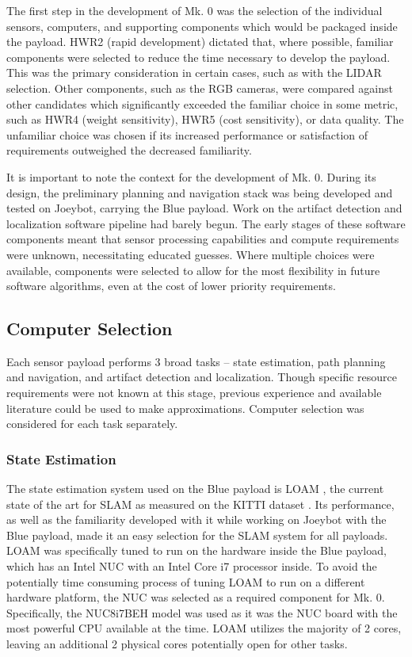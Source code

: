 The first step in the development of Mk. 0 was the selection of the individual sensors, computers, and supporting components which would be packaged inside the payload. HWR2 (rapid development) dictated that, where possible, familiar components were selected to reduce the time necessary to develop the payload. This was the primary consideration in certain cases, such as with the LIDAR selection. Other components, such as the RGB cameras, were compared against other candidates which significantly exceeded the familiar choice in some metric, such as HWR4 (weight sensitivity), HWR5 (cost sensitivity), or data quality. The unfamiliar choice was chosen if its increased performance or satisfaction of requirements outweighed the decreased familiarity.

It is important to note the context for the development of Mk. 0. During its design, the preliminary planning and navigation stack was being developed and tested on Joeybot, carrying the Blue payload. Work on the artifact detection and localization software pipeline had barely begun. The early stages of these software components meant that sensor processing capabilities and compute requirements were unknown, necessitating educated guesses. Where multiple choices were available, components were selected to allow for the most flexibility in future software algorithms, even at the cost of lower priority requirements.

\subsection{Computer Selection}

Each sensor payload performs 3 broad tasks -- state estimation, path planning and navigation, and artifact detection and localization. Though specific resource requirements were not known at this stage, previous experience and available literature could be used to make approximations. Computer selection was considered for each task separately.

\subsubsection{State Estimation}

The state estimation system used on the Blue payload is LOAM \cite{zhang2014loam}, the current state of the art for SLAM as measured on the KITTI dataset \cite{Geiger2013IJRR}. Its performance, as well as the familiarity developed with it while working on Joeybot with the Blue payload, made it an easy selection for the SLAM system for all payloads. LOAM was specifically tuned to run on the hardware inside the Blue payload, which has an Intel NUC with an Intel Core i7 processor inside. To avoid the potentially time consuming process of tuning LOAM to run on a different hardware platform, the NUC was selected as a required component for Mk. 0. Specifically, the NUC8i7BEH model was used as it was the NUC board with the most powerful CPU available at the time. LOAM utilizes the majority of 2 cores, leaving an additional 2 physical cores potentially open for other tasks.

